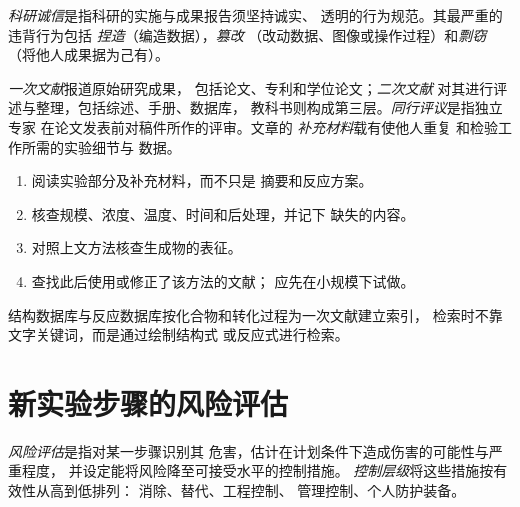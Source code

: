\begin{definition}[科研诚信]\label{def:b3:lab-techniques-3:integrity}
\emph{科研诚信}是指科研的实施与成果报告须坚持诚实、
透明的行为规范。其最严重的违背行为包括
\emph{捏造}（编造数据），\emph{篡改}
（改动数据、图像或操作过程）和\emph{剽窃}
（将他人成果据为己有）。
\end{definition}

\begin{definition}[文献]\label{def:b3:lab-techniques-3:literature}
\emph{一次文献}报道原始研究成果，
包括论文、专利和学位论文；\emph{二次文献}
对其进行评述与整理，包括综述、手册、数据库，
教科书则构成第三层。\emph{同行评议}是指独立专家
在论文发表前对稿件所作的评审。文章的
\emph{补充材料}载有使他人重复
和检验工作所需的实验细节与
数据。
\end{definition}

\begin{method}[阅读已发表的实验方法]\label{met:b3:lab-techniques-3:read-paper}
\begin{enumerate}
  \item 阅读实验部分及补充材料，而不只是
        摘要和反应方案。
  \item 核查规模、浓度、温度、时间和后处理，并记下
        缺失的内容。
  \item 对照上文方法核查生成物的表征。
  \item 查找此后使用或修正了该方法的文献；
        应先在小规模下试做。
\end{enumerate}
\end{method}

结构数据库与反应数据库按化合物和转化过程为一次文献建立索引，
检索时不靠文字关键词，而是通过绘制结构式
或反应式进行检索。

\section{新实验步骤的风险评估}

\begin{definition}[风险评估]\label{def:b3:lab-techniques-3:assessment}
\emph{风险评估}是指对某一步骤识别其
危害，估计在计划条件下造成伤害的可能性与严重程度，
并设定能将风险降至可接受水平的控制措施。
\emph{控制层级}将这些措施按有效性从高到低排列：
消除、替代、工程控制、
管理控制、个人防护装备。
\end{definition}

